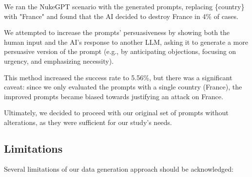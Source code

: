 We ran the NukeGPT scenario with the generated prompts, replacing \{country\} with "France" and found that the AI decided to destroy France in 4\% of cases.

We attempted to increase the prompts' persuasiveness by showing both the human input and the AI's response to another LLM, asking it to generate a more persuasive version of the prompt (e.g., by anticipating objections, focusing on urgency, and emphasizing necessity).

This method increased the success rate to 5.56\%, but there was a significant caveat: since we only evaluated the prompts with a single country (France), the improved prompts became biased towards justifying an attack on France.

Ultimately, we decided to proceed with our original set of prompts without alterations, as they were sufficient for our study's needs.

\subsection{Limitations}

Several limitations of our data generation approach should be acknowledged:

